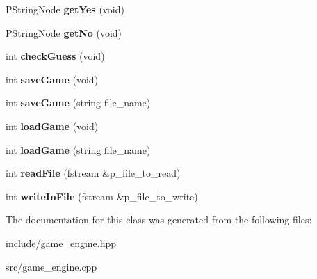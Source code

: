 \begin{DoxyCompactItemize}
\item 
P\+String\+Node {\bfseries get\+Yes} (void)\hypertarget{classGameEngine_ab3f646b7979c18693707356bb2bbea19}{}\label{classGameEngine_ab3f646b7979c18693707356bb2bbea19}

\item 
P\+String\+Node {\bfseries get\+No} (void)\hypertarget{classGameEngine_a55fea2d808bae3ce0ef6d07e0c430c75}{}\label{classGameEngine_a55fea2d808bae3ce0ef6d07e0c430c75}

\item 
int {\bfseries check\+Guess} (void)\hypertarget{classGameEngine_a01b9a5c3114b34869021b391147e61ba}{}\label{classGameEngine_a01b9a5c3114b34869021b391147e61ba}

\item 
int {\bfseries save\+Game} (void)\hypertarget{classGameEngine_ad9b78e44d4eea9bcb98bd58876b1ba7d}{}\label{classGameEngine_ad9b78e44d4eea9bcb98bd58876b1ba7d}

\item 
int {\bfseries save\+Game} (string file\+\_\+name)\hypertarget{classGameEngine_a7e16dc069ce815e79fcef09c19a1a97a}{}\label{classGameEngine_a7e16dc069ce815e79fcef09c19a1a97a}

\item 
int {\bfseries load\+Game} (void)\hypertarget{classGameEngine_a6c6612550ae0b18be1540881859cdaca}{}\label{classGameEngine_a6c6612550ae0b18be1540881859cdaca}

\item 
int {\bfseries load\+Game} (string file\+\_\+name)\hypertarget{classGameEngine_a66fc0b13065015768f4fb6f949329937}{}\label{classGameEngine_a66fc0b13065015768f4fb6f949329937}

\item 
int {\bfseries read\+File} (fstream \&p\+\_\+file\+\_\+to\+\_\+read)\hypertarget{classGameEngine_afa0b28d7d51e3f69d470943e50f017e6}{}\label{classGameEngine_afa0b28d7d51e3f69d470943e50f017e6}

\item 
int {\bfseries write\+In\+File} (fstream \&p\+\_\+file\+\_\+to\+\_\+write)\hypertarget{classGameEngine_adeba29a50b810c32e9b6c8018969325b}{}\label{classGameEngine_adeba29a50b810c32e9b6c8018969325b}

\end{DoxyCompactItemize}


The documentation for this class was generated from the following files\+:\begin{DoxyCompactItemize}
\item 
include/game\+\_\+engine.\+hpp\item 
src/game\+\_\+engine.\+cpp\end{DoxyCompactItemize}
